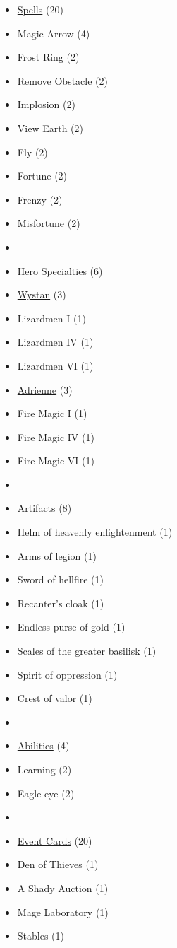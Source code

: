 \begin{multicols}{3}
\begin{itemize}[leftmargin=0pt, label={}, noitemsep, noitemsep]
  \item \underline{Spells} (20)
  \item Magic Arrow (4)
  \item Frost Ring (2)
  \item Remove Obstacle (2)
  \item Implosion (2)
  \item View Earth (2)
  \item Fly (2)
  \item Fortune (2)
  \item Frenzy (2)
  \item Misfortune (2)
  \item
  \item \underline{Hero Specialties} (6)
  \item \underline{Wystan} (3)
  \item Lizardmen I (1)
  \item Lizardmen IV (1)
  \item Lizardmen VI (1)
  \item \underline{Adrienne} (3)
  \item Fire Magic I (1)
  \item Fire Magic IV (1)
  \item Fire Magic VI (1)
  \item
  \item \underline{Artifacts} (8)
  \item Helm of heavenly enlightenment (1)
  \item Arms of legion (1)
  \item Sword of hellfire (1)
  \item Recanter's cloak (1)
  \item Endless purse of gold (1)
  \item Scales of the greater basilisk (1)
  \item Spirit of oppression (1)
  \item Crest of valor (1)
  \item
  \item \underline{Abilities} (4)
  \item Learning (2)
  \item Eagle eye (2)
  \item
  \item \underline{Event Cards} (20)
  \item Den of Thieves (1)
  \item A Shady Auction (1)
  \item Mage Laboratory (1)
  \item Stables (1)

\end{itemize}
\end{multicols}
